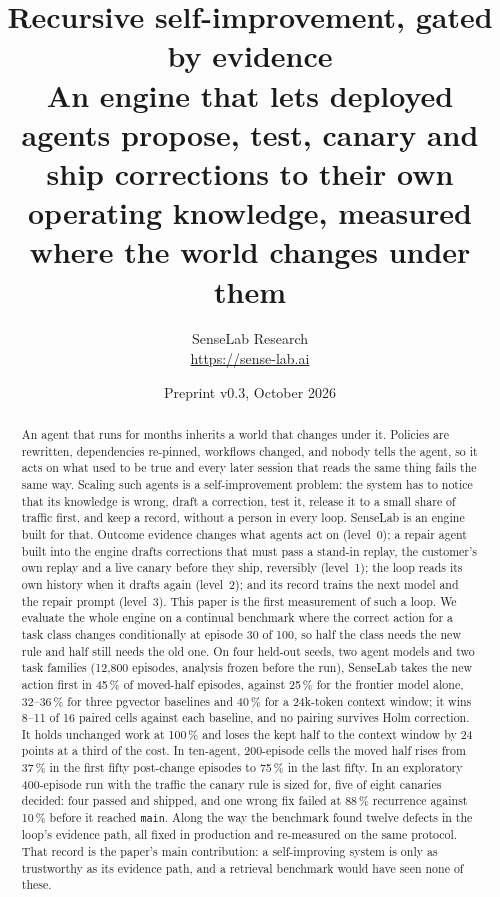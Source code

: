 \documentclass[11pt]{article}
\title{\vspace{-2.2em}\bfseries Recursive self-improvement, gated by evidence\\[0.3em]
\large An engine that lets deployed agents propose, test, canary and ship corrections to their own operating knowledge, measured where the world changes under them}
\author{SenseLab Research\\[0.3em]\normalsize\url{https://sense-lab.ai}}
\date{Preprint v0.3, October 2026}
\newcommand{\code}[1]{\texttt{#1}}
\begin{document}
\sloppy
\maketitle

\begin{abstract}
\noindent
An agent that runs for months inherits a world that changes under it. Policies are rewritten,
dependencies re-pinned, workflows changed, and nobody tells the agent, so it acts on what used
to be true and every later session that reads the same thing fails the same way. Scaling such
agents is a self-improvement problem: the system has to notice that its knowledge is wrong,
draft a correction, test it, release it to a small share of traffic first, and keep a record,
without a person in every loop. SenseLab is an engine built for that. Outcome evidence changes
what agents act on (level~0); a repair agent built into the engine drafts corrections that must
pass a stand-in
replay, the customer's own replay and a live canary before they ship, reversibly (level~1); the
loop reads its own history when it drafts again (level~2); and its record trains the next model
and the repair prompt (level~3). This paper is the first measurement of such a loop. We evaluate
the whole engine on a continual benchmark where the correct action for a task class changes
conditionally at episode 30 of 100, so half the class needs the new rule and half still needs
the old one. On four held-out seeds, two agent models and two task families (12,800 episodes,
analysis frozen before the run), SenseLab takes the new action first in 45\,\% of moved-half
episodes, against 25\,\% for the frontier model alone, 32--36\,\% for three pgvector baselines
and 40\,\% for a 24k-token context window; it wins 8--11 of 16 paired cells against each
baseline, and no pairing survives Holm correction. It holds unchanged work at 100\,\% and loses
the kept half to the context window by 24 points at a third of the cost. In ten-agent,
200-episode cells the moved half rises from 37\,\% in the first fifty post-change episodes to
75\,\% in the last fifty. In an exploratory 400-episode run with the traffic the canary rule is
sized for, five of eight canaries decided: four passed and shipped, and one wrong fix failed at
88\,\% recurrence against 10\,\% before it reached \code{main}. Along the way the benchmark
found twelve defects in the loop's evidence path, all fixed in production and re-measured on the
same protocol. That record is the paper's main contribution: a self-improving system is only as
trustworthy as its evidence path, and a retrieval benchmark would have seen none of these.
\end{abstract}
\end{document}
